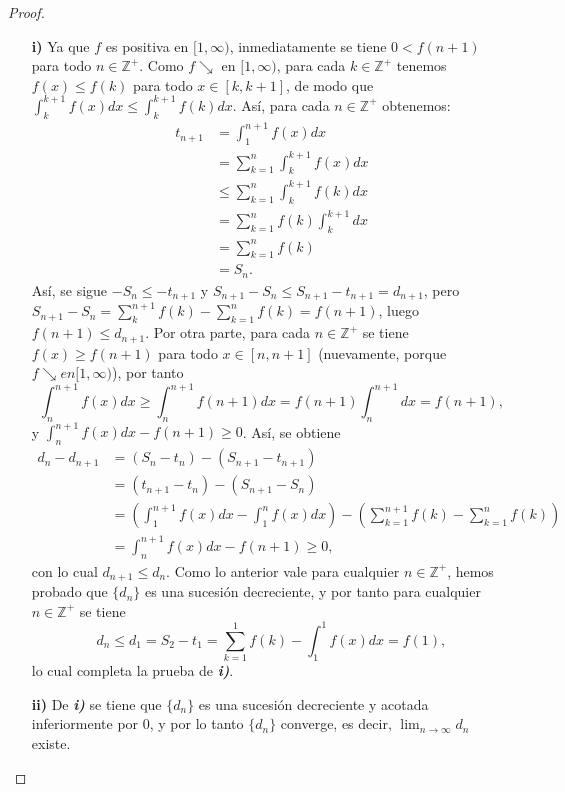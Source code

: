 \begin{proof}
  \begin{itemize}
    \item[\textbf{i)}] Ya que $f$ es positiva en $[1,\infty)$, inmediatamente se tiene $0<f(n+1)$ para todo $n\in\mathbb{Z}^+$. Como $f \searrow$ en $[1,\infty)$, para cada $k\in\mathbb{Z}^+$ tenemos $f(x)\leq f(k)$ para todo $x\in[k,k+1]$, de modo que $\int_k^{k+1}f(x)dx\leq \int_k^{k+1}f(k)dx$. Así, para cada $n\in\mathbb{Z}^+$ obtenemos:
    \begin{align*}
      t_{n+1}&=\int_1^{n+1}f(x)dx\\
      &=\sum_{k=1}^n \int_k^{k+1}f(x)dx\\
      &\leq\sum_{k=1}^n \int_k^{k+1}f(k)dx\\
      &=\sum_{k=1}^n f(k)\int_k^{k+1}dx\\
      &=\sum_{k=1}^n f(k)\\
      &=S_n.
    \end{align*}
    Así, se sigue $-S_n\leq-t_{n+1}$ y $S_{n+1}-S_n\leq S_{n+1}-t_{n+1}=d_{n+1}$, pero $S_{n+1}-S_n=\sum_k^{n+1}f(k)-\sum_{k=1}^nf(k)=f(n+1)$, luego $f(n+1)\leq d_{n+1}$. Por otra parte, para cada $n\in\mathbb{Z}^+$ se tiene $f(x)\geq f(n+1)$ para todo $x\in[n,n+1]$ (nuevamente, porque $f\searrow en [1,\infty)$), por tanto
    \begin{equation*}
      \int_n^{n+1}f(x)dx\geq\int_n^{n+1}f(n+1)dx=f(n+1)\int_n^{n+1}dx=f(n+1),
    \end{equation*}
    y $\int_n^{n+1}f(x)dx-f(n+1)\geq 0$. Así, se obtiene
    \begin{align*}
      d_n-d_{n+1}&=(S_n-t_n)-(S_{n+1}-t_{n+1})\\
      &=(t_{n+1}-t_n)-(S_{n+1}-S_n)\\
      &=(\int_1^{n+1}f(x)dx-\int_1^{n}f(x)dx)-(\sum_{k=1}^{n+1}f(k)-\sum_{k=1}^n f(k))\\
      &=\int_n^{n+1}f(x)dx-f(n+1)\geq 0,
    \end{align*}
    con lo cual $d_{n+1}\leq d_n$. Como lo anterior vale para cualquier $n\in\mathbb{Z}^+$, hemos probado que $\lbrace{d_n\rbrace}$ es una sucesión decreciente, y por tanto para cualquier $n\in\mathbb{Z}^+$ se tiene
    \begin{equation*}
      d_n\leq d_1=S_2-t_1=\sum_{k=1}^1f(k)-\int_1^{1}f(x)dx=f(1),
    \end{equation*}
    lo cual completa la prueba de \textit{\textbf{i)}}.
    \item[\textbf{ii)}] De \textit{\textbf{i)}} se tiene que $\lbrace{d_n\rbrace}$ es una sucesión decreciente y acotada inferiormente por $0$, y por lo tanto $\lbrace{d_n\rbrace}$ converge, es decir, $\lim_{n\to\infty}d_n$ existe.

\end{itemize}
\end{proof}
